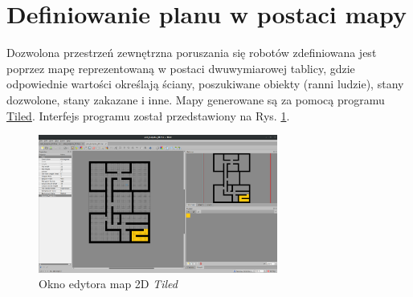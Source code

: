 \section{Definiowanie planu w postaci mapy}
Dozwolona przestrzeń zewnętrzna poruszania się robotów zdefiniowana jest poprzez mapę reprezentowaną w postaci dwuwymiarowej tablicy, gdzie odpowiednie wartości określają ściany, poszukiwane obiekty (ranni ludzie), stany dozwolone, stany zakazane i inne. Mapy generowane są za pomocą programu \href{https://www.mapeditor.org/}{Tiled}. Interfejs programu został przedstawiony na Rys. \ref{fig:tiled}.
\begin{figure}[H]
    \centering
    \includegraphics[width=0.7\textwidth]{figures/tiled}
    \caption{Okno edytora map 2D \textit{Tiled}}
    \label{fig:tiled}
\end{figure}

